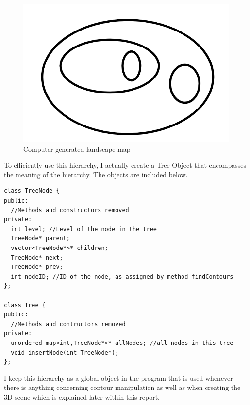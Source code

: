 \documentclass[11pt]{article}
\begin{document}
\begin{figure}
	\includegraphics[scale=0.4]{pics/perfectsimple.png}
	\caption{Computer generated landscape map}
	\label{perfectsimple}
\end{figure}

To efficiently use this hierarchy, I actually create a Tree Object that
encompasses the meaning of the hierarchy. The objects are included below.

\begin{lstlisting}
class TreeNode {
public:
  //Methods and constructors removed
private:
  int level; //Level of the node in the tree
  TreeNode* parent;
  vector<TreeNode*>* children;
  TreeNode* next;
  TreeNode* prev;
  int nodeID; //ID of the node, as assigned by method findContours
};

class Tree {
public:
  //Methods and contructors removed
private:
  unordered_map<int,TreeNode*>* allNodes; //all nodes in this tree
  void insertNode(int TreeNode*);
};
\end{lstlisting}

I keep this hierarchy as a global object in the program that is used
whenever there is anything concerning contour manipulation as well as when
creating the 3D scene which is explained later within this report.
\end{document}
